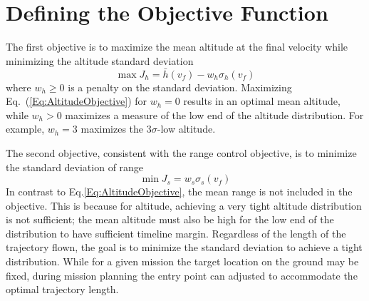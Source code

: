 \section{Defining the Objective Function}
The first objective is to maximize the mean altitude at the final velocity while minimizing the altitude standard deviation
\begin{equation}
	\max J_h = \bar{h}(v_f) - w_h\sigma_h(v_f) \label{Eq:AltitudeObjective}
\end{equation}
where $w_h\ge0$ is a penalty on the standard deviation. Maximizing Eq.~(\ref{Eq:AltitudeObjective}) for $w_h=0$ results in an optimal mean altitude, while $w_h>0$ maximizes a measure of the low end of the altitude distribution. For example, $w_h=3$ maximizes the 3$\sigma$-low altitude. 

The second objective, consistent with the range control objective, is to minimize the standard deviation of range 
\begin{equation}
	\min J_s = w_s\sigma_s(v_f) \label{Eq:RangeObjective}
\end{equation}
In contrast to Eq.\eqref{Eq:AltitudeObjective}, the mean range is not included in the objective. This is because for altitude, achieving a very tight altitude distribution is not sufficient; the mean altitude must also be high for the low end of the distribution to have sufficient timeline margin. Regardless of the length of the trajectory flown, the goal is to minimize the standard deviation to achieve a tight distribution. While for a given mission the target location on the ground may be fixed, during mission planning the entry point can adjusted to accommodate the optimal trajectory length. 

